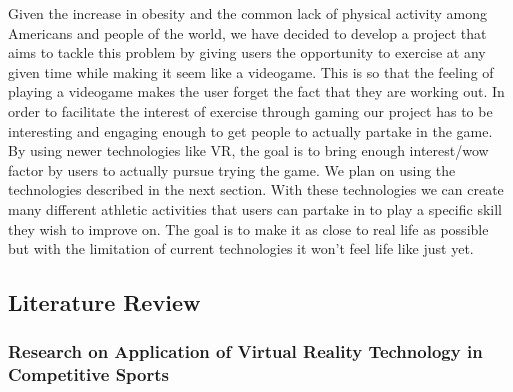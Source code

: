 \documentclass{sigchi}
\begin{document}
Given the increase in obesity and the common lack of physical activity among Americans and people of the world, we have decided to develop a project that aims to tackle this problem by giving users the opportunity to exercise at any given time while making it seem like a videogame. This is so that the feeling of playing a videogame makes the user forget the fact that they are working out. In order to facilitate the interest of exercise through gaming our project has to be interesting and engaging enough to get people to actually partake in the game. By using newer technologies like VR, the goal is to bring enough interest/wow factor by users to actually pursue trying the game. We plan on using the technologies described in the next section. With these technologies we can create many different athletic activities that users can partake in to play a specific skill they wish to improve on. The goal is to make it as close to real life as possible but with the limitation of current technologies it won’t feel life like just yet. 

\subsection{Literature Review}

\subsubsection{Research on Application of Virtual Reality Technology in Competitive Sports}
\end{document}

